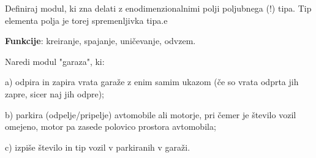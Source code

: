 \begin{ex}
Definiraj modul, ki zna delati z enodimenzionalnimi polji poljubnega (!)
tipa. Tip elementa polja je torej spremenljivka tipa.e

\textbf{Funkcije}: kreiranje, spajanje, uni\v cevanje, odvzem.
\end{ex} 
\begin{ex}
Naredi modul "garaza", ki:

a) odpira in zapira vrata gara\v ze z enim samim ukazom (\v ce so vrata
odprta jih zapre, sicer naj jih odpre);

b) parkira (odpelje/pripelje) avtomobile ali motorje, pri \v cemer je
\v stevilo vozil omejeno, motor pa zasede polovico prostora avtomobila;

c) izpi\v se \v stevilo in tip vozil v parkiranih v gara\v zi.
\end{ex}


